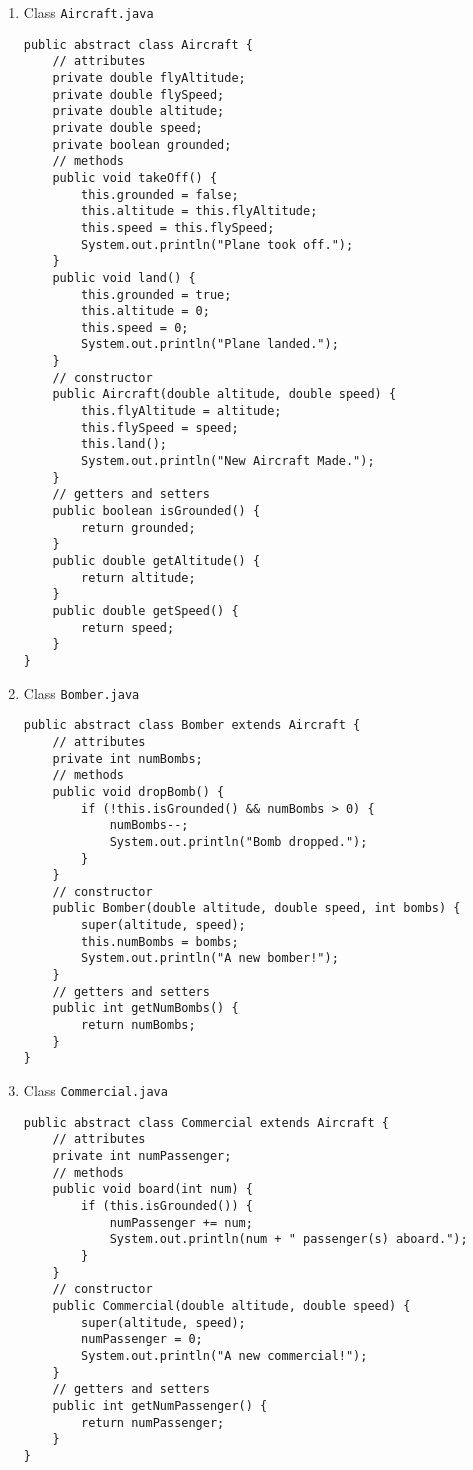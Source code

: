 \begin{enumerate}
\item Class \texttt{Aircraft.java}

\lstset{language=java,tabsize=2}
\begin{lstlisting}
public abstract class Aircraft {
	// attributes
	private double flyAltitude;
	private double flySpeed;
	private double altitude;
	private double speed;
	private boolean grounded;
	// methods
	public void takeOff() {
		this.grounded = false;
		this.altitude = this.flyAltitude;
		this.speed = this.flySpeed;
		System.out.println("Plane took off.");
	}
	public void land() {
		this.grounded = true;
		this.altitude = 0;
		this.speed = 0;
		System.out.println("Plane landed.");
	}
	// constructor
	public Aircraft(double altitude, double speed) {
		this.flyAltitude = altitude;
		this.flySpeed = speed;
		this.land();
		System.out.println("New Aircraft Made.");
	}
	// getters and setters
	public boolean isGrounded() {
		return grounded;
	}
	public double getAltitude() {
		return altitude;
	}
	public double getSpeed() {
		return speed;
	}
}
\end{lstlisting}

\item Class \texttt{Bomber.java}

\lstset{language=java,tabsize=2}
\begin{lstlisting}
public abstract class Bomber extends Aircraft {
	// attributes
	private int numBombs;
	// methods
	public void dropBomb() {
		if (!this.isGrounded() && numBombs > 0) {
			numBombs--;
			System.out.println("Bomb dropped.");
		}
	}
	// constructor
	public Bomber(double altitude, double speed, int bombs) {
		super(altitude, speed);
		this.numBombs = bombs;
		System.out.println("A new bomber!");
	}
	// getters and setters
	public int getNumBombs() {
		return numBombs;
	}
}
\end{lstlisting}

\item Class \texttt{Commercial.java}

\lstset{language=java,tabsize=2}
\begin{lstlisting}
public abstract class Commercial extends Aircraft {
	// attributes
	private int numPassenger;
	// methods
	public void board(int num) {
		if (this.isGrounded()) {
			numPassenger += num;
			System.out.println(num + " passenger(s) aboard.");
		}
	}
	// constructor
	public Commercial(double altitude, double speed) {
		super(altitude, speed);
		numPassenger = 0;
		System.out.println("A new commercial!");
	}
	// getters and setters
	public int getNumPassenger() {
		return numPassenger;
	}
}
\end{lstlisting}


\end{enumerate}
